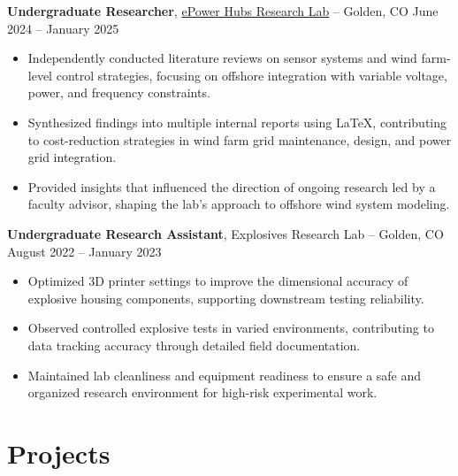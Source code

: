 \documentclass[11pt]{article}       %
\begin{document}
\textbf{Undergraduate Researcher}, \href{https://www.epowerhubs.com/home}{ePower Hubs Research Lab} -- Golden, CO \hfill June 2024 -- January 2025
\vspace{-5pt}
\begin{itemize}
  \item Independently conducted literature reviews on sensor systems and wind farm-level control strategies, focusing on offshore integration with variable voltage, power, and frequency constraints.
  \item Synthesized findings into multiple internal reports using LaTeX, contributing to cost-reduction strategies in wind farm grid maintenance, design, and power grid integration.
  \item Provided insights that influenced the direction of ongoing research led by a faculty advisor, shaping the lab's approach to offshore wind system modeling.
\end{itemize}

\textbf{Undergraduate Research Assistant}, Explosives Research Lab -- Golden, CO \hfill August 2022 -- January 2023
\vspace{-5pt}
\begin{itemize}
  \item Optimized 3D printer settings to improve the dimensional accuracy of explosive housing components, supporting downstream testing reliability.
  \item Observed controlled explosive tests in varied environments, contributing to data tracking accuracy through detailed field documentation.
  \item Maintained lab cleanliness and equipment readiness to ensure a safe and organized research environment for high-risk experimental work.
\end{itemize}

\vspace{-12pt}
\section*{Projects}
\vspace{3pt}
\end{document}
